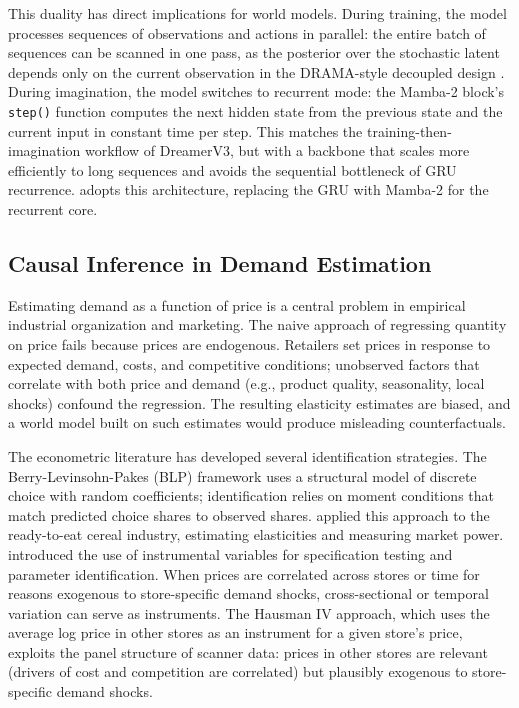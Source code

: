 This duality has direct implications for world models. During training, the model processes sequences of observations and actions in parallel: the entire batch of sequences can be scanned in one pass, as the posterior over the stochastic latent depends only on the current observation in the DRAMA-style decoupled design \citep{rajbhandari2024drama}. During imagination, the model switches to recurrent mode: the Mamba-2 block's \texttt{step()} function computes the next hidden state from the previous state and the current input in constant time per step. This matches the training-then-imagination workflow of DreamerV3, but with a backbone that scales more efficiently to long sequences and avoids the sequential bottleneck of GRU recurrence. \dreamprice{} adopts this architecture, replacing the GRU with Mamba-2 for the recurrent core.

\subsection{Causal Inference in Demand Estimation}

Estimating demand as a function of price is a central problem in empirical industrial organization and marketing. The naive approach of regressing quantity on price fails because prices are endogenous. Retailers set prices in response to expected demand, costs, and competitive conditions; unobserved factors that correlate with both price and demand (e.g., product quality, seasonality, local shocks) confound the regression. The resulting elasticity estimates are biased, and a world model built on such estimates would produce misleading counterfactuals.

The econometric literature has developed several identification strategies. The Berry-Levinsohn-Pakes (BLP) framework \citep{berry1995automobile} uses a structural model of discrete choice with random coefficients; identification relies on moment conditions that match predicted choice shares to observed shares. \citet{nevo2001measuring} applied this approach to the ready-to-eat cereal industry, estimating elasticities and measuring market power. \citet{hausman1978specification} introduced the use of instrumental variables for specification testing and parameter identification. When prices are correlated across stores or time for reasons exogenous to store-specific demand shocks, cross-sectional or temporal variation can serve as instruments. The Hausman IV approach, which uses the average log price in other stores as an instrument for a given store's price, exploits the panel structure of scanner data: prices in other stores are relevant (drivers of cost and competition are correlated) but plausibly exogenous to store-specific demand shocks.

